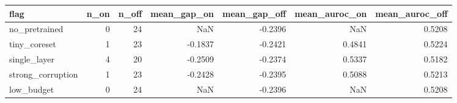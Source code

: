 \begin{tabular}{lrrrrrr}
\toprule
             flag &  n\_on &  n\_off &  mean\_gap\_on &  mean\_gap\_off &  mean\_auroc\_on &  mean\_auroc\_off \\
\midrule
    no\_pretrained &     0 &     24 &          NaN &       -0.2396 &            NaN &          0.5208 \\
     tiny\_coreset &     1 &     23 &      -0.1837 &       -0.2421 &         0.4841 &          0.5224 \\
     single\_layer &     4 &     20 &      -0.2509 &       -0.2374 &         0.5337 &          0.5182 \\
strong\_corruption &     1 &     23 &      -0.2428 &       -0.2395 &         0.5088 &          0.5213 \\
       low\_budget &     0 &     24 &          NaN &       -0.2396 &            NaN &          0.5208 \\
\bottomrule
\end{tabular}

